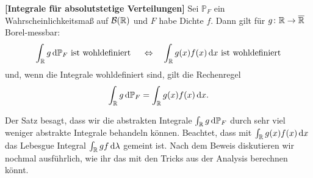 \begin{satz}\label{IntDichten}
\textbf{[Integrale f\"ur absolutstetige Verteilungen]}
	Sei $\mathbb{P}_F$ ein Wahrscheinlichkeitsmaß auf $\mathcal{B}(\mathbb{R})$ und $F$ habe Dichte $f$.	Dann gilt für $g\colon \mathbb{R} \to \overline{\mathbb{R}}$ Borel-messbar: 
	\begin{align}\label{Gleich}
		\int_{\mathbb{R}} g \, \mathrm{d} \mathbb{P}_F \text{ ist wohldefiniert }\quad \Leftrightarrow\quad \int_{\mathbb{R}} g(x)f(x) \, \mathrm{d} x\text{ ist wohldefiniert}
	\end{align}
	und, wenn die Integrale wohldefiniert sind, gilt die Rechenregel  \[ \int_{\mathbb{R}} g \, \mathrm{d} \mathbb{P}_F = \int_{\mathbb{R}} g(x) f(x) \, \mathrm{d} x. \]
\end{satz}
 Der Satz besagt, dass wir die abstrakten Integrale $\int_{\mathbb{R}} g \, \mathrm{d} \mathbb P_F$ durch sehr viel weniger abstrakte Integrale behandeln k\"onnen. Beachtet, dass mit $\int_{\mathbb{R}} g(x)f(x) \, \mathrm{d} x$ das Lebesgue Integral $\int_{\mathbb{R}} g f \, \mathrm{d} \lambda$ gemeint ist. Nach dem Beweis diskutieren wir nochmal ausf\"uhrlich, wie ihr das mit den Tricks aus der Analysis berechnen k\"onnt. 
